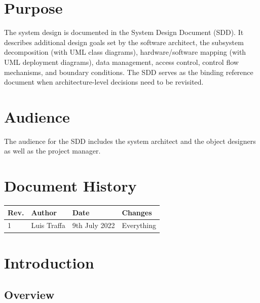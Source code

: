 \documentclass[a4paper,12pt]{scrartcl}
\begin{document}
    \section*{Purpose}
    The system design is documented in the System Design Document (SDD). It describes additional design goals set by the software architect, the subsystem decomposition (with UML class diagrams), hardware/software mapping (with UML deployment diagrams), data management, access control, control flow mechanisms, and boundary conditions. The SDD serves as the binding reference document when architecture-level decisions need to be revisited.

    \section*{Audience}
    The audience for the SDD includes the system architect and the object designers as well as the project manager.
    \nopagebreak

    \renewcommand{\contentsname}{Table of Contents}
    \tableofcontents
    \section*{Document History}

    \begin{tabular}{
        |p{}%
        |p{}%
        |p{}
        |p{}|%
    }
        \hline
        Rev. & Author & Date            & Changes          \\
        \hline
        1    & Luis Traffa  & 9th July 2022 & Everything \\
       
        \hline
    \end{tabular}
    \newpage
    \sectionfont{\color[HTML]{355a8a}}  %
    \subsectionfont{\color[HTML]{4e81bc}}


    \section{Introduction}
    
    \subsection{Overview}
        
\end{document}
